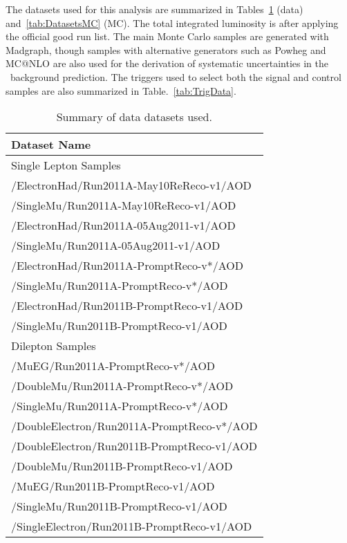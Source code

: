
The datasets used for this analysis are summarized in 
Tables~\ref{tab:DatasetsData} (data) and~\ref{tab:DatasetsMC} (MC).
The total integrated luminosity is \lumi after
applying the official good run list. The main Monte Carlo
samples are generated with Madgraph, though samples with
alternative generators such as Powheg and MC@NLO are also used for
the derivation of systematic uncertainties in the \ttbar~background prediction. 
The triggers used to select both the signal and control samples are
also summarized in Table.~\ref{tab:TrigData}.

\begin{table}[!ht]
\begin{center}
\begin{tabular}{l}
\hline
Dataset Name   \\
\hline
\hline
Single Lepton Samples \\
\hline
/ElectronHad/Run2011A-May10ReReco-v1/AOD \\
/SingleMu/Run2011A-May10ReReco-v1/AOD \\
/ElectronHad/Run2011A-05Aug2011-v1/AOD \\
/SingleMu/Run2011A-05Aug2011-v1/AOD \\
/ElectronHad/Run2011A-PromptReco-v*/AOD \\
/SingleMu/Run2011A-PromptReco-v*/AOD \\
/ElectronHad/Run2011B-PromptReco-v1/AOD \\
/SingleMu/Run2011B-PromptReco-v1/AOD \\
\hline
\hline
Dilepton Samples \\
\hline
/MuEG/Run2011A-PromptReco-v*/AOD   \\
/DoubleMu/Run2011A-PromptReco-v*/AOD   \\
/SingleMu/Run2011A-PromptReco-v*/AOD   \\
/DoubleElectron/Run2011A-PromptReco-v*/AOD   \\
/DoubleElectron/Run2011B-PromptReco-v1/AOD   \\
/DoubleMu/Run2011B-PromptReco-v1/AOD   \\
/MuEG/Run2011B-PromptReco-v1/AOD   \\
/SingleMu/Run2011B-PromptReco-v1/AOD   \\
/SingleElectron/Run2011B-PromptReco-v1/AOD   \\
\hline
\end{tabular}
\caption{Summary of data datasets used.\label{tab:DatasetsData}}
\end{center}
\end{table}

